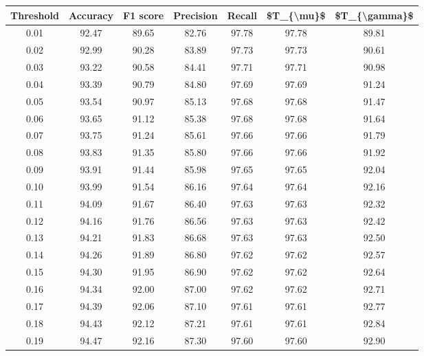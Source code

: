 \begin{tabular}{|c|c|c|c|c|c|c|}
\hline
 Threshold &  Accuracy &  F1 score &  Precision &  Recall &  \$T\_\{\textbackslash mu\}\$ &  \$T\_\{\textbackslash gamma\}\$ \\
\hline
      0.01 &     92.47 &     89.65 &      82.76 &   97.78 &      97.78 &         89.81 \\
      0.02 &     92.99 &     90.28 &      83.89 &   97.73 &      97.73 &         90.61 \\
      0.03 &     93.22 &     90.58 &      84.41 &   97.71 &      97.71 &         90.98 \\
      0.04 &     93.39 &     90.79 &      84.80 &   97.69 &      97.69 &         91.24 \\
      0.05 &     93.54 &     90.97 &      85.13 &   97.68 &      97.68 &         91.47 \\
      0.06 &     93.65 &     91.12 &      85.38 &   97.68 &      97.68 &         91.64 \\
      0.07 &     93.75 &     91.24 &      85.61 &   97.66 &      97.66 &         91.79 \\
      0.08 &     93.83 &     91.35 &      85.80 &   97.66 &      97.66 &         91.92 \\
      0.09 &     93.91 &     91.44 &      85.98 &   97.65 &      97.65 &         92.04 \\
      0.10 &     93.99 &     91.54 &      86.16 &   97.64 &      97.64 &         92.16 \\
      0.11 &     94.09 &     91.67 &      86.40 &   97.63 &      97.63 &         92.32 \\
      0.12 &     94.16 &     91.76 &      86.56 &   97.63 &      97.63 &         92.42 \\
      0.13 &     94.21 &     91.83 &      86.68 &   97.63 &      97.63 &         92.50 \\
      0.14 &     94.26 &     91.89 &      86.80 &   97.62 &      97.62 &         92.57 \\
      0.15 &     94.30 &     91.95 &      86.90 &   97.62 &      97.62 &         92.64 \\
      0.16 &     94.34 &     92.00 &      87.00 &   97.62 &      97.62 &         92.71 \\
      0.17 &     94.39 &     92.06 &      87.10 &   97.61 &      97.61 &         92.77 \\
      0.18 &     94.43 &     92.12 &      87.21 &   97.61 &      97.61 &         92.84 \\
      0.19 &     94.47 &     92.16 &      87.30 &   97.60 &      97.60 &         92.90 \\

\end{tabular}

